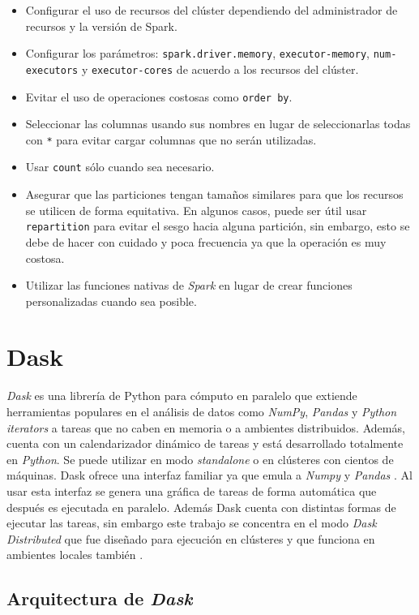 \begin{itemize}
	\item Configurar el uso de recursos del clúster dependiendo del administrador de recursos y la versión de Spark.
	\item Configurar los parámetros: \texttt{spark.driver.memory}, \texttt{executor-memory}, \texttt{num-executors} y \texttt{executor-cores} de acuerdo a los recursos del clúster.
	\item Evitar el uso de operaciones costosas como \texttt{order by}. 
	\item Seleccionar las columnas usando sus nombres en lugar de seleccionarlas todas con \texttt{*} para evitar cargar columnas que no serán utilizadas.
	\item Usar \texttt{count} sólo cuando sea necesario.
	\item Asegurar que las particiones tengan tamaños similares para que los recursos se utilicen de forma equitativa. En algunos casos, puede ser útil usar \texttt{repartition} para evitar el sesgo hacia alguna partición, sin embargo, esto se debe de hacer con cuidado y poca frecuencia ya que la operación es muy costosa.
	\item Utilizar las funciones nativas de \textit{Spark} en lugar de crear funciones personalizadas cuando sea posible.
	 	
\end{itemize}

\section{Dask}

\textit{Dask} es una librería de Python para cómputo en paralelo que extiende herramientas populares en el análisis de datos como \textit{NumPy}, \textit{Pandas} y \textit{Python iterators} a tareas que no caben en memoria o a ambientes distribuidos. Además, cuenta con un calendarizador dinámico de tareas y está desarrollado totalmente en \textit{Python}. Se puede utilizar en modo \textit{standalone} o en clústeres con cientos de máquinas. Dask ofrece una interfaz familiar ya que emula a \textit{Numpy} y \textit{Pandas} \cite{daskdocs}. Al usar esta interfaz se genera una gráfica de tareas de forma automática que después es ejecutada en paralelo. Además Dask cuenta con distintas formas de ejecutar las tareas, sin embargo este trabajo se concentra en el modo \textit{Dask Distributed} que fue diseñado para ejecución en clústeres y que funciona en ambientes locales también \cite{daskscheduling}.

\subsection{Arquitectura de \textit{Dask}}

